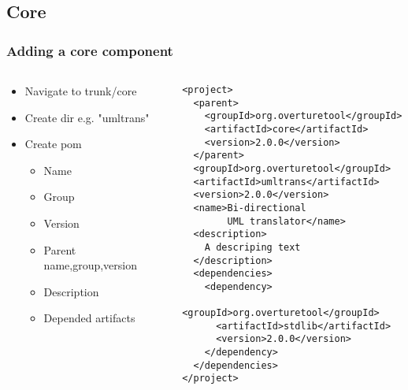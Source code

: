 \subsection{Core}
\begin{frame}[fragile]
  \frametitle{Adding a core component}
\begin{columns}
\begin{column}{5cm}
	\begin{itemize}
		\item Navigate to trunk/core
		\item Create dir e.g. "umltrans"
		\item Create pom
		\begin{itemize}
			\item Name
			\item Group
			\item Version
			\item Parent name,group,version
			\item Description
			\item Depended artifacts
		\end{itemize}
		
	 \end{itemize}
\end{column}
\begin{column}{6cm}
	\pause
	\begin{lstlisting}
<project>
  <parent>
    <groupId>org.overturetool</groupId>
    <artifactId>core</artifactId>
    <version>2.0.0</version>
  </parent>
  <groupId>org.overturetool</groupId>
  <artifactId>umltrans</artifactId>
  <version>2.0.0</version>
  <name>Bi-directional   
        UML translator</name>
  <description>
    A descriping text
  </description>
  <dependencies>
    <dependency>
      <groupId>org.overturetool</groupId>
      <artifactId>stdlib</artifactId>
      <version>2.0.0</version>
    </dependency>
  </dependencies>
</project>
	\end{lstlisting}
\end{column}
\end{columns}


\end{frame}

